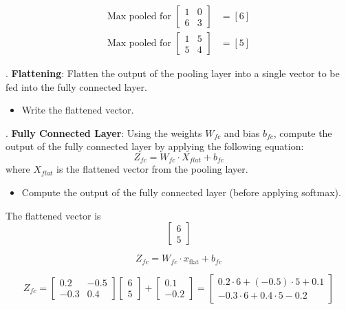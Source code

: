 \documentclass[a4 paper]{article}
\begin{document}

\begin{align*}
\text{Max pooled for } 
\begin{bmatrix} 1 & 0 \\ 6 & 3 \end{bmatrix} & = [6] \\[6pt]
\text{Max pooled for } 
\begin{bmatrix} 1 & 5 \\ 5 & 4 \end{bmatrix} & = [5]
\end{align*}


. \textbf{Flattening}: Flatten the output of the pooling layer into a single vector to be fed into the fully connected layer.
    \begin{itemize}
        \item Write the flattened vector.
    \end{itemize}

. \textbf{Fully Connected Layer}: Using the weights $W_{fc}$ and bias $b_{fc}$, compute the output of the fully connected layer by applying the following equation:
    \[
    Z_{fc} = W_{fc} \cdot X_{flat} + b_{fc}
    \]
    where $X_{flat}$ is the flattened vector from the pooling layer.
    \begin{itemize}
        \item Compute the output of the fully connected layer (before applying softmax).
    \end{itemize}


The flattened vector is 
\[
\begin{bmatrix} 6 \\ 5 \end{bmatrix}
\]

\[
Z_{fc} = W_{fc} \cdot x_{\text{flat}} + b_{fc}
\]

\[
Z_{fc} =
\begin{bmatrix}
0.2 & -0.5 \\
-0.3 & 0.4
\end{bmatrix}
\begin{bmatrix}
6 \\ 5
\end{bmatrix}
+
\begin{bmatrix}
0.1 \\ -0.2
\end{bmatrix}
=
\begin{bmatrix}
0.2 \cdot 6 + (-0.5) \cdot 5 + 0.1 \\
-0.3 \cdot 6 + 0.4 \cdot 5 - 0.2
\end{bmatrix}
\]
\end{document}
